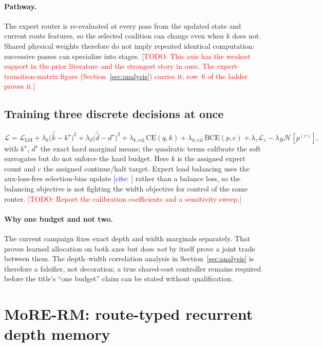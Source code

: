 \documentclass[11pt]{article}
\newcommand{\TODO}[1]{\textcolor{red}{[TODO: #1]}}
\newcommand{\CITE}[1]{\textcolor{blue}{[cite: \detokenize{#1}]}}
\begin{document}
\paragraph{Pathway.} The expert router is re-evaluated at every pass from the
updated state and current route features, so the selected coalition can change
even when $k$ does not. Shared physical weights therefore do not imply repeated
identical computation: successive passes can specialize into stages.
\TODO{This axis has the weakest support in the prior literature and the strongest
story in ours. The expert-transition-matrix figure
(Section~\ref{sec:analysis}) carries it; row~6 of the ladder proves it.}

\subsection{Training three discrete decisions at once}

\[
  \mathcal{L} = \mathcal{L}_{\mathrm{LM}}
  + \lambda_k \big(\bar{\hat{k}} - k^\star\big)^2
  + \lambda_d \big(\bar{\hat{d}} - d^\star\big)^2
  + \lambda_{k,\mathrm{cal}}\,\mathrm{CE}(q, k)
  + \lambda_{d,\mathrm{cal}}\,\mathrm{BCE}(p, c)
  + \lambda_z \mathcal{L}_z
  - \lambda_H \mathcal{H}\!\left[p^{(r)}\right],
\]
with $k^\star$, $d^\star$ the exact hard marginal means; the quadratic terms
calibrate the soft surrogates but do not enforce the hard budget. Here $k$ is
the assigned expert count and $c$ the assigned continue/halt target. Expert load balancing
uses the aux-loss-free selection-bias update \CITE{deepseekv3} rather than a
balance loss, so the balancing objective is not fighting the width objective for
control of the same router.
\TODO{Report the calibration coefficients and a sensitivity sweep.}

\paragraph{Why one budget and not two.} The current campaign fixes exact depth
and width marginals separately. That proves learned allocation on both axes but
does \emph{not} by itself prove a joint trade between them. The depth--width
correlation analysis in Section~\ref{sec:analysis} is therefore a falsifier, not
decoration; a true shared-cost controller remains required before the title's
``one budget'' claim can be stated without qualification.

\section{MoRE-RM: route-typed recurrent depth memory}
\label{sec:rm}
\end{document}
